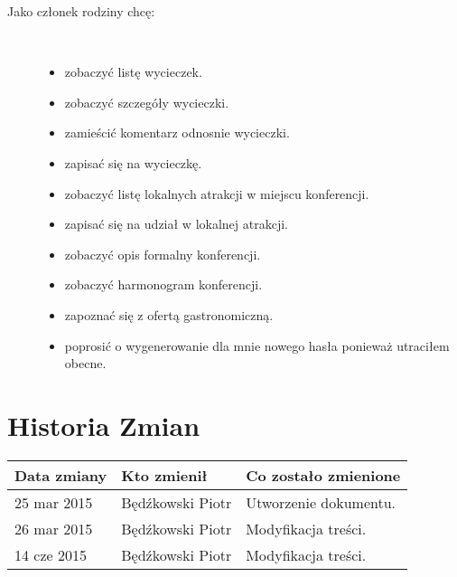 \begin{description}
  \item[Jako członek rodziny chcę:] \hfill \\
  \begin{itemize}
    \item zobaczyć listę wycieczek. \\
    \item zobaczyć szczegóły wycieczki.\\
    \item zamieścić komentarz odnosnie wycieczki.\\
    \item zapisać się na wycieczkę.\\
    \item zobaczyć listę lokalnych atrakcji w miejscu konferencji.\\
    \item zapisać się na udział w lokalnej atrakcji.\\
    \item zobaczyć opis formalny konferencji.\\
    \item zobaczyć harmonogram konferencji.\\
    \item zapoznać się z ofertą gastronomiczną.\\
    \item poprosić o wygenerowanie dla mnie nowego hasła ponieważ utraciłem obecne.\\
  \end{itemize}

\end{description}

\section{Historia Zmian}

\begin{tabularx}{\textwidth}{X|l|X}
\hline
\textbf{Data zmiany} & \textbf{Kto zmienił} & \textbf{Co zostało zmienione} \\ \hline
25 mar 2015          & Będźkowski Piotr     & Utworzenie dokumentu.         \\ \hline
26 mar 2015          & Będźkowski Piotr     & Modyfikacja treści.           \\ \hline
14 cze 2015          & Będźkowski Piotr     & Modyfikacja treści.           \\ \hline
\end{tabularx}
